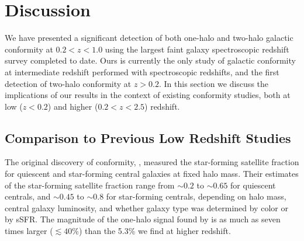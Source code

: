 
\section{Discussion}\label{sec:discussion}


We have presented a significant detection of both one-halo and two-halo galactic conformity 
at ${0.2 < z < 1.0}$ using the largest faint galaxy spectroscopic redshift survey completed to date.  
Ours is currently the only study of galactic conformity at intermediate redshift performed with 
spectroscopic redshifts, and the first detection of two-halo conformity at $z>0.2$.
In this section we discuss the implications of our results in the context of existing conformity 
studies, both at low ($z<0.2$) and higher (${0.2<z<2.5}$) redshift.



\subsection{Comparison to Previous Low Redshift Studies}\label{sec:compare_low}


The original discovery of conformity, \citet{Weinmann06}, measured the star-forming satellite fraction for quiescent and
star-forming central galaxies at fixed halo mass.
Their estimates of the star-forming satellite fraction range from $\sim0.2$ to $\sim0.65$ for quiescent centrals, and $\sim0.45$ to $\sim0.8$ for star-forming
centrals, depending on halo mass, central galaxy luminosity, and whether galaxy type was determined by color or by sSFR.
The magnitude of the one-halo signal found by \citet{Weinmann06} is as much as seven times larger ($\lesssim40$\%) than the 5.3\% 
we find at higher redshift.


